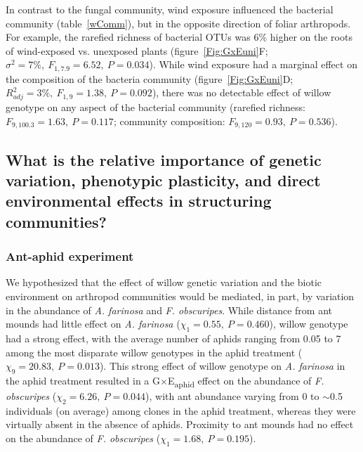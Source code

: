 \documentclass[11pt]{article}
\begin{document}
In contrast to the fungal community, wind exposure influenced the
bacterial community (table~\ref{wComm}), but in the opposite direction of foliar
arthropods. For example, the rarefied richness of bacterial OTUs was 6\%
higher on the roots of wind-exposed vs. unexposed plants (figure~\ref{Fig:GxEuni}F;
\(\sigma^2=7\%,\ F_{1,7.9}=6.52,\ P=0.034\)). While wind exposure had a marginal effect on the
composition of the bacteria community (figure~\ref{Fig:GxEuni}D; \(R_{adj}^2=3\%,\ F_{1,9}=1.38,\ P=0.092\)),
there was no detectable effect of willow genotype on any aspect of the
bacterial community (rarefied richness: \(F_{9,100.3}=1.63,\ P=0.117\); community
composition: \(F_{9,120}=0.93,\ P=0.536\)).

\subsection*{What is the relative importance of genetic
variation, phenotypic plasticity, and direct environmental effects in
structuring
communities?}

\subsubsection*{Ant-aphid experiment}

We hypothesized that the effect of willow genetic variation and the
biotic environment on arthropod communities would be mediated, in part,
by variation in the abundance of \textit{A. farinosa} and \textit{F.
obscuripes}. While distance from ant mounds had little effect on \textit{A.
farinosa} (\(\chi_1=0.55,\ P=0.460\)), willow genotype had a strong effect, with
the average number of aphids ranging from 0.05 to 7 among the most
disparate willow genotypes in the aphid treatment (\(\chi_9=20.83,\ P=0.013\)).
This strong effect of willow genotype on \textit{A. farinosa} in the aphid
treatment resulted in a G$\times$E\textsubscript{aphid} effect on the abundance
of \textit{F. obscuripes} ($\chi_2=6.26, \ P=0.044$), with ant abundance varying
from 0 to $\sim$0.5 individuals (on average) among clones in
the aphid treatment, whereas they were virtually absent in the absence
of aphids. Proximity to ant mounds had no effect on the abundance of
\textit{F. obscuripes} (\(\chi_1=1.68,\ P=0.195\)).
\end{document}
